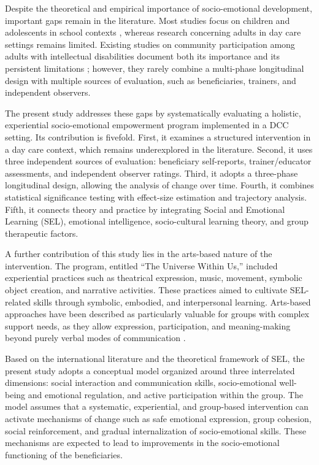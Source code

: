 \documentclass[12pt,a4paper]{article}
\begin{document}
Despite the theoretical and empirical importance of socio-emotional development, important gaps remain in the literature. Most studies focus on children and adolescents in school contexts \parencite{durlak2011,humphrey2013,oberle2019}, whereas research concerning adults in day care settings remains limited. Existing studies on community participation among adults with intellectual disabilities document both its importance and its persistent limitations \parencite{hall2009,verdonschot2009}; however, they rarely combine a multi-phase longitudinal design with multiple sources of evaluation, such as beneficiaries, trainers, and independent observers.

The present study addresses these gaps by systematically evaluating a holistic, experiential socio-emotional empowerment program implemented in a DCC setting. Its contribution is fivefold. First, it examines a structured intervention in a day care context, which remains underexplored in the literature. Second, it uses three independent sources of evaluation: beneficiary self-reports, trainer/educator assessments, and independent observer ratings. Third, it adopts a three-phase longitudinal design, allowing the analysis of change over time. Fourth, it combines statistical significance testing with effect-size estimation and trajectory analysis. Fifth, it connects theory and practice by integrating Social and Emotional Learning (SEL), emotional intelligence, socio-cultural learning theory, and group therapeutic factors.

A further contribution of this study lies in the arts-based nature of the intervention. The program, entitled ``The Universe Within Us,'' included experiential practices such as theatrical expression, music, movement, symbolic object creation, and narrative activities. These practices aimed to cultivate SEL-related skills through symbolic, embodied, and interpersonal learning. Arts-based approaches have been described as particularly valuable for groups with complex support needs, as they allow expression, participation, and meaning-making beyond purely verbal modes of communication \parencite{leavy2015,stickley2018}.

Based on the international literature and the theoretical framework of SEL, the present study adopts a conceptual model organized around three interrelated dimensions: social interaction and communication skills, socio-emotional well-being and emotional regulation, and active participation within the group. The model assumes that a systematic, experiential, and group-based intervention can activate mechanisms of change such as safe emotional expression, group cohesion, social reinforcement, and gradual internalization of socio-emotional skills. These mechanisms are expected to lead to improvements in the socio-emotional functioning of the beneficiaries.
\end{document}
